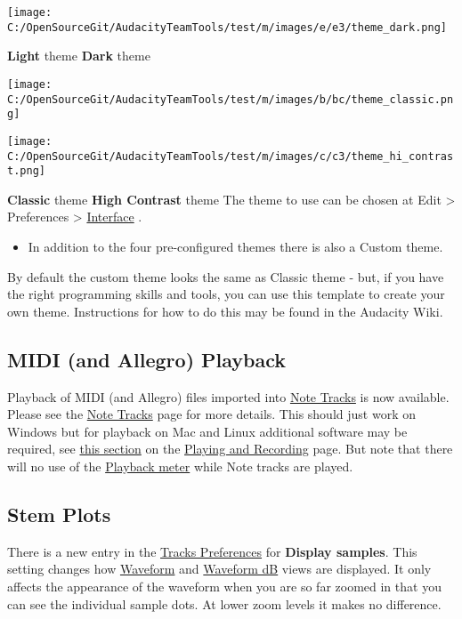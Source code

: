\begin{multicols}{2}
\par\texttt{[image: C:/OpenSourceGit/AudacityTeamTools/test/m/images/e/e3/theme\_dark.png]}\par
\par \textbf{Light} theme
\textbf{Dark} theme
\par 
\par\texttt{[image: C:/OpenSourceGit/AudacityTeamTools/test/m/images/b/bc/theme\_classic.png]}\par

\par\texttt{[image: C:/OpenSourceGit/AudacityTeamTools/test/m/images/c/c3/theme\_hi\_contrast.png]}\par
\par \textbf{Classic} theme
\textbf{High Contrast} theme
The theme to use can be chosen at Edit > Preferences > 
\hyperref[\foo{interface:preferences:}]{Interface}
.  

\begin{itemize}
\item  In addition to the four pre-configured themes there is also a Custom theme.  
\end{itemize}
 By default the custom theme looks the same as Classic theme - but, if you have the right programming skills and tools, you can use this template to create your own theme.  Instructions for how to do this may be found in the Audacity Wiki.
\subsection{MIDI (and Allegro) Playback}
\label{new:features:in:this:release:midi}Playback of MIDI (and Allegro) files imported into 
\hyperref[\foo{note:tracks:}]{Note Tracks}
 is now available.  Please see the 
\hyperref[\foo{note:tracks:}]{Note Tracks}
 page for more details.
This should just work on Windows but for playback on Mac and Linux additional software may be required, see 
\hyperref[\foo{playing:and:recording:midi}]{this section}
 on the 
\hyperref[\foo{playing:and:recording:}]{Playing and Recording}
 page.
But note that there will no use of the 
\hyperref[\foo{meter:toolbar:playback}]{Playback meter}
 while Note tracks are played. 

\subsection{Stem Plots}
\label{new:features:in:this:release:stemplots}There is a new entry in the 
\hyperref[\foo{tracks:preferences:}]{Tracks Preferences}
 for \textbf{Display samples}.  This setting changes how 
\hyperref[\foo{audacity:waveform:}]{Waveform}
 and 
\hyperref[\foo{audacity:waveform:db}]{Waveform dB}
 views are displayed.  It only affects the appearance of the waveform when you are so far zoomed in that you can see the individual sample dots.  At lower zoom levels it makes no difference.  


\end{multicols}
